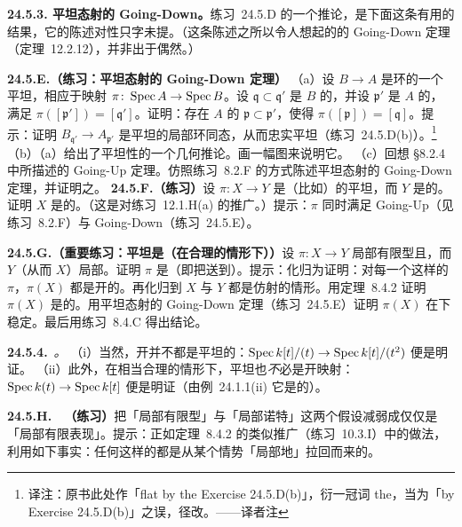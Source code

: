 \textbf{24.5.3. 平坦态射的 Going-Down。}\quad \mbox{练习~24.5.D} 的一个推论，是下面这条有用的结果，它的陈述对\trFaithfullyFlat{}性只字未提。（这条陈述之所以令人想起\trIntegrallyClosed{}\trIntegralDomain{}的\trFinite\trExtension{}的 Going-Down 定理（\mbox{定理~12.2.12}），并非出于偶然。）

\textbf{24.5.E.（练习：平坦态射的 Going-Down 定理）}\quad
（a）设 $B\to A$ 是环的一个平坦\trMorphism，相应于映射 $\pi\colon\operatorname{Spec} A\to\operatorname{Spec} B$。设 $\mathfrak{q}\subset\mathfrak{q}'$ 是 $B$ 的\trPrimeIdeal，并设 $\mathfrak{p}'$ 是 $A$ 的\trPrimeIdeal，满足 $\pi([\mathfrak{p}'])=[\mathfrak{q}']$。证明：存在 $A$ 的\trPrimeIdeal{} $\mathfrak{p}\subset\mathfrak{p}'$，使得 $\pi([\mathfrak{p}])=[\mathfrak{q}]$。提示：证明 $B_{\mathfrak{q}'}\to A_{\mathfrak{p}'}$ 是平坦的局部环同态，从而忠实平坦（\mbox{练习~24.5.D}(b)）。\footnote{译注：原书此处作「flat by the Exercise 24.5.D(b)」，衍一冠词 the，当为「by Exercise 24.5.D(b)」之误，径改。——译者注}
（b）\mbox{（a）}给出了平坦性的一个几何推论。画一幅图来说明它。
（c）回想 \S8.2.4 中所描述的 Going-Up 定理。仿照\mbox{练习~8.2.F} 的方式陈述平坦态射的 Going-Down 定理，并证明之。
\textbf{24.5.F.（练习）}\quad 设 $\pi\colon X\to Y$ 是\trIntegral{}（比如\trFinite）的平坦\trMorphism，而 $Y$ 是\trPureDimensional{}的。证明 $X$ 是\trPureDimensional{}的。（这是对\mbox{练习~12.1.H}(a) 的推广。）提示：$\pi$ 同时满足 Going-Up（见\mbox{练习~8.2.F}）与 Going-Down（\mbox{练习~24.5.E}）。

\textbf{24.5.G.（重要练习：平坦\trMorphism{}是\trOpenMap{}（在合理的情形下））}\quad 设 $\pi\colon X\to Y$ 局部有限型且\trFlat，而 $Y$（从而 $X$）局部\trNoether。证明 $\pi$ 是\trOpenMap{}（即把\trOpenSet{}送到\trOpenSet）。提示：化归为证明：对每一个这样的 $\pi$，$\pi(X)$ 都是开的。再化归到 $X$ 与 $Y$ 都是仿射的情形。用\mbox{\trChevalley{}定理~8.4.2} 证明 $\pi(X)$ 是\trConstructible{}的。用平坦态射的 Going-Down 定理（\mbox{练习~24.5.E}）证明 $\pi(X)$ 在\trGenerization{}下稳定。最后用\mbox{练习~8.4.C} 得出结论。

\textbf{24.5.4.}\ \emph{\trhRemark。}\quad
（i）当然，开\trMorphism{}并不都是平坦的：$\operatorname{Spec} k[t]/(t)\to\operatorname{Spec} k[t]/(t^{2})$ 便是明证。
（ii）此外，在相当合理的情形下，平坦\trMorphism{}也\emph{不}必是开映射：$\operatorname{Spec} k(t)\to\operatorname{Spec} k[t]$ 便是明证（由\mbox{例~24.1.1}(ii) 它是\trFlat{}的）。

\textbf{24.5.H.}\ \hard\ \textbf{（练习）}\quad 把「局部有限型」与「局部诺特」这两个假设减弱成仅仅是「局部有限表现」。提示：正如\mbox{\trChevalley{}定理~8.4.2} 的类似推广（\mbox{练习~10.3.I}）中的做法，利用如下事实：任何这样的\trMorphism{}都是从某个\trNoether{}情势「局部地」拉回而来的。

